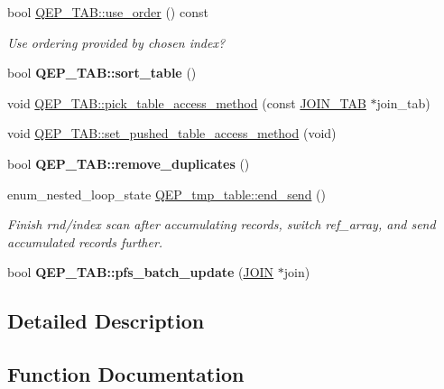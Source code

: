 \begin{DoxyCompactItemize}
bool \mbox{\hyperlink{group__Query__Executor_ga685838679adf501ece418d4bd969f2ea}{Q\+E\+P\+\_\+\+T\+A\+B\+::use\+\_\+order}} () const
\begin{DoxyCompactList}\small\item\em Use ordering provided by chosen index? \end{DoxyCompactList}\item 
\mbox{\label{group__Query__Executor_ga9ead874e1e879b621085292a1c98fbbc}} 
bool {\bfseries Q\+E\+P\+\_\+\+T\+A\+B\+::sort\+\_\+table} ()
\item 
void \mbox{\hyperlink{group__Query__Executor_gaf6ecbbe7a1950c60e06170bce55ff70e}{Q\+E\+P\+\_\+\+T\+A\+B\+::pick\+\_\+table\+\_\+access\+\_\+method}} (const \mbox{\hyperlink{classJOIN__TAB}{J\+O\+I\+N\+\_\+\+T\+AB}} $\ast$join\+\_\+tab)
\item 
void \mbox{\hyperlink{group__Query__Executor_gae69d0ee5d7d438abeff1d7d4c99abd8f}{Q\+E\+P\+\_\+\+T\+A\+B\+::set\+\_\+pushed\+\_\+table\+\_\+access\+\_\+method}} (void)
\item 
\mbox{\label{group__Query__Executor_gabd9c43f5c99dab9d64e8a5723806e47b}} 
bool {\bfseries Q\+E\+P\+\_\+\+T\+A\+B\+::remove\+\_\+duplicates} ()
\item 
enum\+\_\+nested\+\_\+loop\+\_\+state \mbox{\hyperlink{group__Query__Executor_ga1cbaa4a44140f41c161eaab87c25f473}{Q\+E\+P\+\_\+tmp\+\_\+table\+::end\+\_\+send}} ()
\begin{DoxyCompactList}\small\item\em Finish rnd/index scan after accumulating records, switch ref\+\_\+array, and send accumulated records further. \end{DoxyCompactList}\item 
\mbox{\label{group__Query__Executor_ga191937944ea06a62814887a9c104a7d7}} 
bool {\bfseries Q\+E\+P\+\_\+\+T\+A\+B\+::pfs\+\_\+batch\+\_\+update} (\mbox{\hyperlink{classJOIN}{J\+O\+IN}} $\ast$join)
\end{DoxyCompactItemize}


\subsection{Detailed Description}


\subsection{Function Documentation}
\mbox{\label{group__Query__Executor_ga108fbed43151ab58878335fbb84503c1}} 
